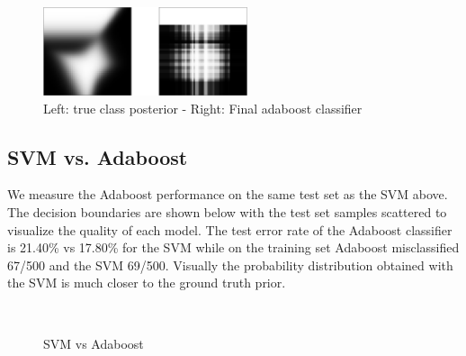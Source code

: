 \documentclass{acmsiggraph}
\newcommand{\1}{\mathbbm{1}}
\begin{document}
\begin{figure}[H]
\centering
\includegraphics[width=6cm]{classifiers}
\caption*{Left: true class posterior  - Right: Final adaboost classifier }
\end{figure}

\subsection{SVM vs. Adaboost}
We measure the Adaboost performance on the same test set as the SVM above. The decision boundaries are shown below with the test set samples scattered to visualize the quality of each model. The test error rate of the Adaboost classifier is 21.40\% vs 17.80\% for the SVM while on the training set Adaboost misclassified 67/500 and the SVM 69/500. Visually the probability distribution obtained with the SVM is much closer to the ground truth prior. 
\begin{figure}[H]
\centering
{}\\
\caption*{SVM vs Adaboost}
\end{figure} 
\end{document}
